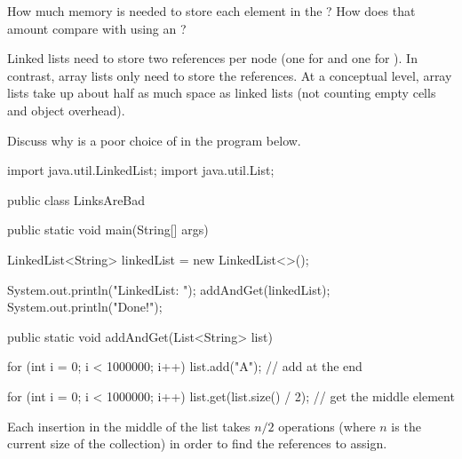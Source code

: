 \Q How much memory is needed to store each element in the ?
How does that amount compare with using an ?

\begin{answer}
Linked lists need to store two references per node (one for  and one for ).
In contrast, array lists only need to store the  references.
At a conceptual level, array lists take up about half as much space as linked lists (not counting empty cells and object overhead).
\end{answer}


\Q \label{LinksAreBad}
Discuss why  is a poor choice of  in the program below.

\vspace{1ex}
\begin{javabox}
import java.util.LinkedList;
import java.util.List;

public class LinksAreBad
{
    public static void main(String[] args)
    {
        LinkedList<String> linkedList = new LinkedList<>();

        System.out.println("LinkedList: ");
        addAndGet(linkedList);
        System.out.println("Done!");
    }

    public static void addAndGet(List<String> list)
    {
        for (int i = 0; i < 1000000; i++)
        {
            list.add("A");  // add at the end
        }

        for (int i = 0; i < 1000000; i++)
        {
            list.get(list.size() / 2);  // get the middle element
        }
    }
}
\end{javabox}
\vspace{-1ex}

\begin{answer}[3em]
Each insertion in the middle of the list takes $n/2$ operations (where $n$ is the current size of the collection) in order to find the  references to assign.
\end{answer}
